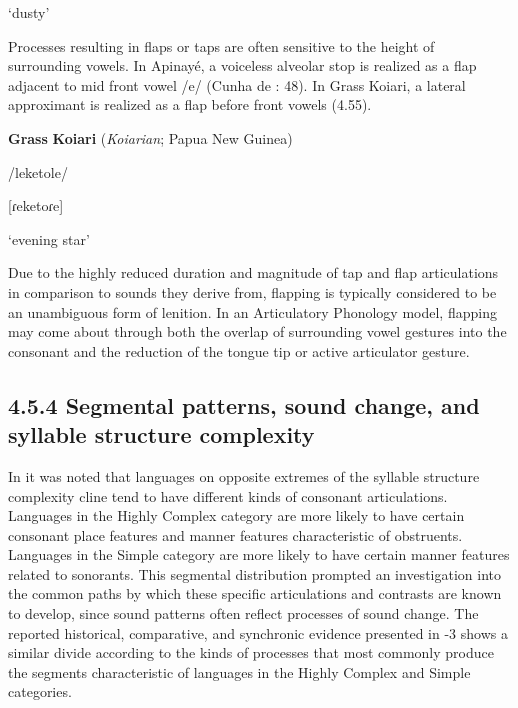 ‘dusty’



\citep[18]{Benton1971}


\z

  Processes resulting in flaps or taps are often sensitive to the height of surrounding vowels. In Apinayé, a voiceless alveolar stop is realized as a flap adjacent to mid front vowel /e/ (Cunha de \citealt{Oliveira2005}: 48). In Grass Koiari, a lateral approximant is realized as a flap before front vowels (4.55).



\ea\label{ex:(4.55)}
  \textbf{Grass} \textbf{Koiari} (\textit{Koiarian}; Papua New Guinea)



/leketole/



[ɾeketoɾe]



‘evening star’



\citep[6]{Dutton1996}


\z

  Due to the highly reduced duration and magnitude of tap and flap articulations in comparison to sounds they derive from, flapping is typically considered to be an unambiguous form of lenition. In an Articulatory Phonology model, flapping may come about through both the overlap of surrounding vowel gestures into the consonant and the reduction of the tongue tip or active articulator gesture. 


\subsection{4.5.4 Segmental patterns, sound change, and syllable structure complexity}

  In  it was noted that languages on opposite extremes of the syllable structure complexity cline tend to have different kinds of consonant articulations. Languages in the Highly Complex category are more likely to have certain consonant place features and manner features characteristic of obstruents. Languages in the Simple category are more likely to have certain manner features related to sonorants. This segmental distribution prompted an investigation into the common paths by which these specific articulations and contrasts are known to develop, since sound patterns often reflect processes of sound change. The reported historical, comparative, and synchronic evidence presented in -3 shows a similar divide according to the kinds of processes that most commonly produce the segments characteristic of languages in the Highly Complex and Simple categories.



